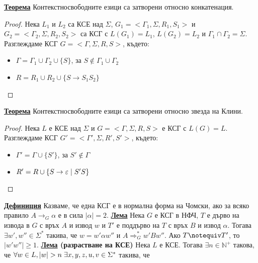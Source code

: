 \documentclass{article}
\begin{document}
\textbf{\underline{Теорема}} \newline
Контекстносвободните езици са затворени относно конкатенация.
\begin{proof}
Нека $L_1$ и $L_2$ са КСЕ над $\Sigma$, $G_1 = <\Gamma_1, \Sigma, R_1, S_1>$ и $G_2 = <\Gamma_2, \Sigma, R_2, S_2>$ са КСГ с $L(G_1) = L_1$,
$L(G_2) = L_2$ и $\Gamma_1 \cap \Gamma_2 = \Sigma$. \newline Разглеждаме КСГ $G = <\Gamma, \Sigma, R, S>$, където:
\begin{itemize}
    \item $\Gamma = \Gamma_1 \cup \Gamma_2 \cup \{S\}$, за $S \notin \Gamma_1 \cup \Gamma_2$
    \item $R = R_1 \cup R_2 \cup \{S \rightarrow S_1 S_2\}$
\end{itemize}
\end{proof}
\textbf{\underline{Теорема}} \newline
Контекстносвободните езици са затворени относно звезда на Клини.
\begin{proof}
Нека $L$ е КСЕ над $\Sigma$ и $G = <\Gamma, \Sigma, R, S>$ е КСГ с $L(G) = L$. Разглеждаме КСГ $G' = <\Gamma', \Sigma, R', S'>$, където:
\begin{itemize}
    \item $\Gamma' = \Gamma \cup \{S'\}$, за $S' \notin \Gamma$
    \item $R' = R \cup \{S \rightarrow \varepsilon \hspace{0.1cm} | \hspace{0.1cm} S'S\}$
\end{itemize}
\end{proof}
\textbf{\underline{Дефиниция}}
Казваме, че една КСГ е в нормална форма на Чомски, ако за всяко правило $A \rightarrow_{G} \alpha$ е в сила $|\alpha| = 2$. \newline\newline
\textbf{\underline{Лема}} \newline
Нека $G$ е КСГ в НФЧ, $T$ е дърво на извода в $G$ с връх $A$ и извод $w$ и $T'$ е поддърво на $T$ с връх $B$ и извод $\alpha$. Тогава $\exists
w', w'' \in \Sigma^*$ такива, че $w = w'\alpha w''$ и $A \Rightarrow^*_{G} w'Bw''$. Ако $T \notequiv T'$, то $|w'w''| \ge 1$. \newline\newline
\textbf{\underline{Лема} (разрастване на КСЕ)} \newline
Нека $L$ е КСЕ. Тогава $\exists n \in \mathbb{N}^+$ такова, че $\forall w \in L, |w| > n \hspace{0.1cm} \exists x, y, z, u, v \in \Sigma^*$ такива, че
\end{document}

